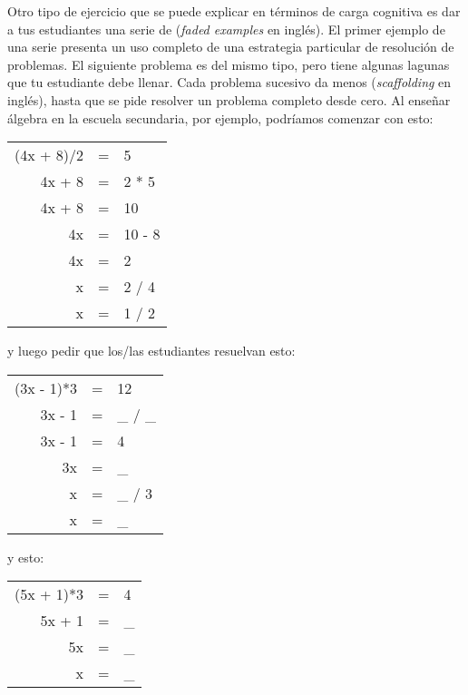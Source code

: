 Otro tipo de ejercicio que se puede explicar en términos de carga cognitiva
es dar a tus estudiantes una serie de  (\emph{faded examples} en inglés).
El primer ejemplo de una serie presenta un uso completo de una estrategia
particular de resolución de problemas.
El siguiente problema es del mismo tipo,
pero tiene algunas lagunas que tu estudiante debe llenar.
Cada problema sucesivo da menos  (\emph{scaffolding} en inglés),
hasta que se pide resolver un problema completo desde cero.
Al enseñar álgebra en la escuela secundaria,
por ejemplo,
podríamos comenzar con esto:


\begin{center}
\begin{tabular}{rcl}
  (4x + 8)/2    & = &    5    \\
  4x + 8    & = &    2 * 5    \\
  4x + 8    & = &    10    \\
  4x        & = &    10 - 8    \\
  4x        & = &    2    \\
  x        & = &    2 / 4    \\
  x        & = &    1 / 2
\end{tabular}
\end{center}

\noindent
y luego pedir que los/las estudiantes resuelvan esto:

\begin{center}
\begin{tabular}{rcl}
  (3x - 1)*3    & = &    12    \\
  3x - 1    & = &    \_ / \_    \\
  3x - 1    & = &    4    \\
  3x        & = &    \_    \\
  x        & = &    \_ / 3    \\
  x        & = &    \_
\end{tabular}
\end{center}

\noindent
y esto:

\begin{center}
\begin{tabular}{rcl}
  (5x + 1)*3    & = &    4    \\
  5x + 1    & = &    \_     \\
  5x        & = &    \_     \\
  x        & = &    \_
\end{tabular}
\end{center}

